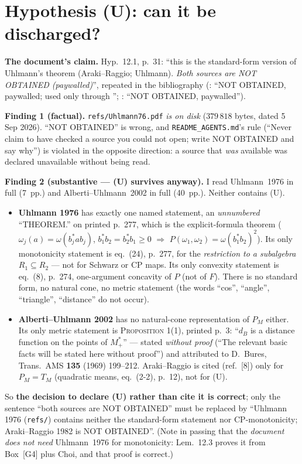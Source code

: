 \documentclass[11pt]{article}
\theoremstyle{definition}\newtheorem{example}[theorem]{Example}
\begin{document}
\section{Hypothesis (U): can it be discharged?}\label{sec:U}

\textbf{The document's claim.}  Hyp.~12.1, p.~31: ``this is the standard-form version of
Uhlmann's theorem (Araki--Raggio; Uhlmann).  \emph{Both sources are NOT OBTAINED
(paywalled)}'', repeated in the bibliography (\cite{Uhl76}: ``NOT OBTAINED, paywalled;
used only through \cite{AU02}''; \cite{AR82}: ``NOT OBTAINED, paywalled'').

\textbf{Finding 1 (factual).}  \texttt{refs/Uhlmann76.pdf} \emph{is on disk}
($379\,818$ bytes, dated 5 Sep 2026).  ``NOT OBTAINED'' is wrong, and
\texttt{README\_AGENTS.md}'s rule (``Never claim to have checked a source you could not
open; write NOT OBTAINED and say why'') is violated in the opposite direction: a source
that \emph{was} available was declared unavailable without being read.

\textbf{Finding 2 (substantive --- (U) survives anyway).}  I read Uhlmann~1976 in full
(7~pp.) and Alberti--Uhlmann~2002 in full (40~pp.).  Neither contains (U).
\begin{itemize}[leftmargin=2em,nosep]
\item \textbf{Uhlmann 1976} has exactly one named statement, an \emph{unnumbered}
 ``THEOREM.'' on printed p.~277, which is the explicit-formula theorem
 ($\omega_j(a)=\omega(b_j^*ab_j)$, $b_1^*b_2=b_2^*b_1\ge0$ $\Rightarrow$
 $P(\omega_1,\omega_2)=\omega(b_1^*b_2)^2$).  Its only monotonicity statement is eq.~(24),
 p.~277, for the \emph{restriction to a subalgebra} $R_1\subseteq R_2$ --- not for Schwarz
 or CP maps.  Its only convexity statement is eq.~(8), p.~274, one-argument concavity of
 $P$ (not of $F$).  There is no standard form, no natural cone, no metric statement (the
 words ``cos'', ``angle'', ``triangle'', ``distance'' do not occur).
\item \textbf{Alberti--Uhlmann 2002} has no natural-cone representation of $P_M$ either.
 Its only metric statement is \textsc{Proposition 1}(1), printed p.~3: ``$d_B$ is a
 distance function on the points of $M^*_+$'' --- stated \emph{without proof} (``The
 relevant basic facts will be stated here without proof'') and attributed to D.~Bures,
 Trans.\ AMS \textbf{135} (1969) 199--212.  Araki--Raggio is cited (ref.~[8]) only for
 $P_M=T_M$ (quadratic means, eq.~(2-2), p.~12), not for (U).
\end{itemize}
So \textbf{the decision to declare (U) rather than cite it is correct}; only the sentence
``both sources are NOT OBTAINED'' must be replaced by ``Uhlmann 1976 (\texttt{refs/})
contains neither the standard-form statement nor CP-monotonicity; Araki--Raggio 1982 is
NOT OBTAINED''.  (Note in passing that the \emph{document does not need} Uhlmann~1976 for
monotonicity: Lem.~12.3 proves it from Box~[G4] plus Choi, and that proof is correct.)
\end{document}
